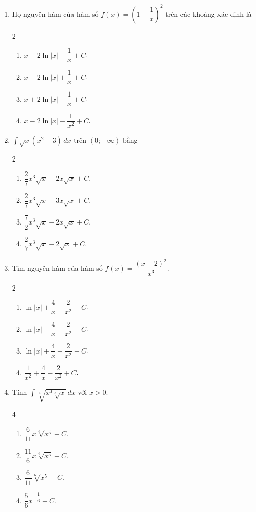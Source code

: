\documentclass[12pt]{article}
\begin{document}
\begin{enumerate}[label=\textbf{Câu \arabic*.}]
		\item Họ nguyên hàm của hàm số $f(x) = \left( 1 - \dfrac{1}{x} \right)^2$ trên các khoảng xác định là
		\begin{multicols}{2}
			\begin{enumerate}[label=\textbf{\Alph*.}]
				\item $x - 2\ln|x| - \dfrac{1}{x} + C$.
				\item $x - 2\ln|x| + \dfrac{1}{x} + C$.
				\item $x + 2\ln|x| - \dfrac{1}{x} + C$.
				\item $x - 2\ln|x| - \dfrac{1}{x^2} + C$.
			\end{enumerate}
		\end{multicols}
		
		\item $\displaystyle \int \sqrt{x}(x^2 - 3) \,dx$ trên $(0; +\infty)$ bằng
		\begin{multicols}{2}
			\begin{enumerate}[label=\textbf{\Alph*.}]
				\item $\dfrac{2}{7}x^3\sqrt{x} - 2x\sqrt{x} + C$.
				\item $\dfrac{2}{7}x^3\sqrt{x} - 3x\sqrt{x} + C$.
				\item $\dfrac{7}{2}x^3\sqrt{x} - 2x\sqrt{x} + C$.
				\item $\dfrac{2}{7}x^3\sqrt{x} - 2\sqrt{x} + C$.
			\end{enumerate}
		\end{multicols}
		
		\item Tìm nguyên hàm của hàm số $f(x) = \dfrac{(x-2)^2}{x^3}$.
		\begin{multicols}{2}
			\begin{enumerate}[label=\textbf{\Alph*.}]
				\item $\ln|x| + \dfrac{4}{x} - \dfrac{2}{x^2} + C$.
				\item $\ln|x| - \dfrac{4}{x} + \dfrac{2}{x^2} + C$.
				\item $\ln|x| + \dfrac{4}{x} + \dfrac{2}{x^2} + C$.
				\item $\dfrac{1}{x^2} + \dfrac{4}{x} - \dfrac{2}{x^2} + C$.
			\end{enumerate}
		\end{multicols}
		
		\item Tính $\displaystyle \int \sqrt[4]{x^3\sqrt[3]{x}} \,dx$ với $x > 0$.
		\begin{multicols}{4}
			\begin{enumerate}[label=\textbf{\Alph*.}]
				\item $\dfrac{6}{11} x\sqrt[6]{x^5} + C$.
				\item $\dfrac{11}{6} x\sqrt[6]{x^5} + C$.
				\item $\dfrac{6}{11} \sqrt[6]{x^5} + C$.
				\item $\dfrac{5}{6} x^{-\dfrac{1}{6}} + C$.
			\end{enumerate}
		\end{multicols}
		

\end{enumerate}
\end{document}
